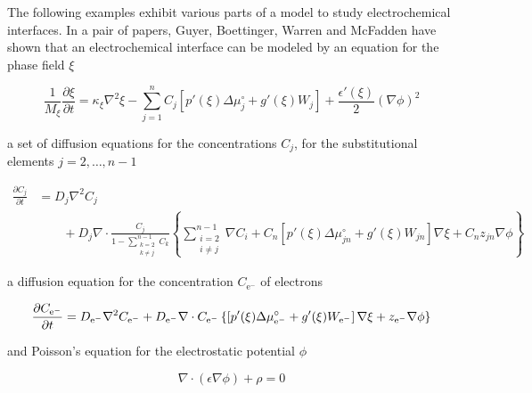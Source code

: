 The following examples exhibit various parts of a model to study
electrochemical interfaces.  In a pair of papers, Guyer, Boettinger, Warren
and McFadden \cite{ElPhFI,ElPhFII} have shown that an electrochemical
interface can be modeled by an equation for the phase field \( \xi \)

\begin{equation}
    \label{eq:elphf:phase}
    \frac{1}{M_\xi}\frac{\partial \xi}{\partial t}
    = 
    \kappa_{\xi}\nabla^2 \xi
    - 
    \sum_{j=1}^{n} C_j \left[
	p'(\xi) \Delta\mu_j^\circ
	+ g'(\xi) W_j
    \right]
    +
    \frac{\epsilon'(\xi)}{2}\left(\nabla\phi\right)^2
\end{equation}

a set of diffusion equations for the concentrations \( C_j \), for the substitutional elements
\( j = 2,\ldots, n-1 \)

\begin{align}
    \label{eq:elphf:substitutional}
    \frac{\partial C_j}{\partial t}
    &= D_{j}\nabla^2 C_j \\
    & \qquad + 
	D_{j}\nabla\cdot 
	\frac{C_j}{1 - \sum_{\substack{k=2\\ k \neq j}}^{n-1} C_k}
	\left\{
	    \sum_{\substack{i=2\\ i \neq j}}^{n-1} \nabla C_i
	    + 
	    C_n \left[
		p'(\xi) \Delta\mu_{jn}^{\circ}
		+ g'(\xi) W_{jn}
	    \right] \nabla\xi
	    +
	    C_n z_{jn} \nabla \phi
	\right\}
\end{align}

a diffusion equation for the concentration \( C_{\text{e}^{-}} \) of
electrons

\begin{equation}
    \label{eq:elphf:interstitial}
    \frac{\partial C_{\text{e}^{-}}}{\partial t}
    = D_{\text{e}^{-}}\nabla^2 C_{\text{e}^{-}} \\
    + D_{\text{e}^{-}}\nabla\cdot 
	C_{\text{e}^{-}}
	\left\{
	    \left[
		p'(\xi) \Delta\mu_{\text{e}^{-}}^{\circ}
		+ g'(\xi) W_{\text{e}^{-}}
	    \right] \nabla\xi
	    +
	    z_{\text{e}^{-}} \nabla \phi
	\right\}
\end{equation}

and Poisson's equation for the electrostatic potential \( \phi \)

\begin{equation}
    \label{eq:elphf:Poisson}
    \nabla\cdot\left(\epsilon\nabla\phi\right) 
    +
    \rho
    = 0
\end{equation}

